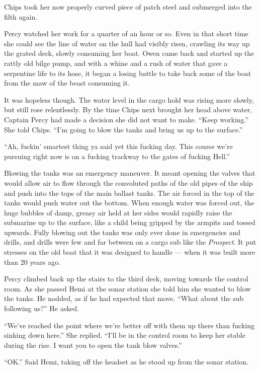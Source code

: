 \documentclass[
]{scrbook}
\begin{document}
Chips took her now properly curved piece of patch steel and submerged
into the filth again.

Percy watched her work for a quarter of an hour or so. Even in that
short time she could see the line of water on the hull had visibly
risen, crawling its way up the grated deck, slowly consuming her boat.
Owen came back and started up the rattly old bilge pump, and with a
whine and a rush of water that gave a serpentine life to its hose, it
began a losing battle to take back some of the boat from the maw of the
beast consuming it.

It was hopeless though. The water level in the cargo hold was rising
more slowly, but still rose relentlessly. By the time Chips next brought
her head above water, Captain Percy had made a decision she did not want
to make. ``Keep working.'' She told Chips. ``I'm going to blow the tanks
and bring us up to the surface.''

``Ah, fuckin' smartest thing ya said yet this fucking day. This course
we're pursuing right now is on a fucking trackway to the gates of
fucking Hell.''

Blowing the tanks was an emergency maneuver. It meant opening the valves
that would allow air to flow through the convoluted paths of the old
pipes of the ship and push into the tops of the main ballast tanks. The
air forced in the top of the tanks would push water out the bottom. When
enough water was forced out, the huge bubbles of damp, greasy air held
at her sides would rapidly raise the submarine up to the surface, like a
child being gripped by the armpits and tossed upwards. Fully blowing out
the tanks was only ever done in emergencies and drills, and drills were
few and far between on a cargo sub like the \emph{Prospect}. It put
stresses on the old boat that it was designed to handle --- when it was
built more than 20 years ago.

Percy climbed back up the stairs to the third deck, moving towards the
control room. As she passed Hemi at the sonar station she told him she
wanted to blow the tanks. He nodded, as if he had expected that move.
``What about the sub following us?'' He asked.

``We've reached the point where we're better off with them up there than
fucking sinking down here.'' She replied. ``I'll be in the control room
to keep her stable during the rise. I want you to open the tank blow
valves.''

``OK.'' Said Hemi, taking off the headset as he stood up from the sonar
station.
\end{document}
